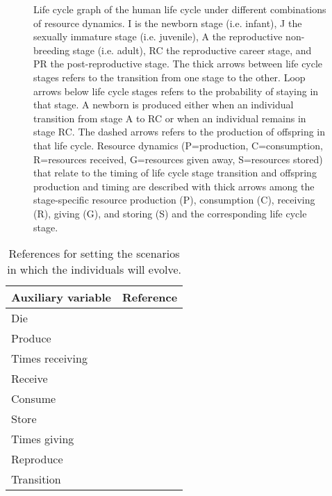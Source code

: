 \documentclass{article}
\begin{document}
\begin{sidewaysfigure}
\begin{figure}[H]
\caption{Life cycle graph of the human life cycle under different combinations of resource dynamics. I is the newborn stage (i.e. infant), J the sexually immature stage (i.e. juvenile), A the reproductive non-breeding stage (i.e. adult), RC the reproductive career stage, and PR the post-reproductive stage. The thick arrows between life cycle stages refers to the transition from one stage to the other. Loop arrows below life cycle stages refers to the probability of staying in that stage. A newborn is produced either when an individual transition from stage A to RC or when an individual remains in stage RC. The dashed arrows refers to the production of offspring in that life cycle. Resource dynamics (P=production, C=consumption, R=resources received, G=resources given away, S=resources stored) that relate to the timing of life cycle stage transition and offspring production and timing are described with thick arrows among the stage-specific resource production (P), consumption (C), receiving (R), giving (G), and storing (S) and the corresponding life cycle stage.}
    \label{fig:2}
\end{figure}
\end{sidewaysfigure}

\begin{table}[H]
    \centering
    \begin{tabular}{ l r }
    \hline
    Auxiliary variable & Reference \\ 
    \hline
    Die & \cite{gurven2007longevity} \\  
    Produce & \cite{koster2020life} \\  
    Times receiving & \cite{gurven2004give} \\  
    Receive & \cite{gurven2004give} \\  
    Consume & \cite{kaplan2000theory} \\  
    Store & \cite{bowles2011cultivation} \\  
    Times giving & \cite{gurven2004give} \\  
    Reproduce & \cite{wood2017dynamics} \\  
    Transition & \cite{ellison2017reproductive,wood2017dynamics,laisk2019demographic} \\
    \hline
    \end{tabular}
    \caption{References for setting the scenarios in which the individuals will evolve.}
    \label{tab:1}
\end{table}

\clearpage



\end{document}

